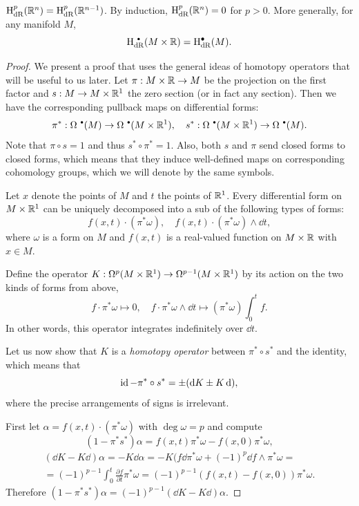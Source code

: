 \begin{thm}\label{Poincare lem}
    $\mathrm{H}^p_{\rm dR}(\mathbb{R}^{n})=\mathrm{H}^{p}_{\rm dR}(\mathbb{R}^{n-1})$. By induction, $\mathrm{H}^p_{\rm dR}(\mathbb{R}^{n})=0$ for $p>0$. More generally, for any manifold $M$,
    \[\rmH^{\smbullet }_{\rm dR}(M\times\bbR)=\rmH^{\bullet}_{\rm dR}(M).\]
\end{thm}
\begin{proof}
    We present a proof that uses the general ideas of homotopy operators that will be useful to us later. Let $\pi:M\times\mathbb{R} \to M$ be the projection on the first factor and $s:M\to M\times\mathbb{R}^1$ the zero section (or in fact any section). Then we have the corresponding pullback maps on differential forms:
    \[\pi^\ast:\Omega^{\smbullet }(M)\to \Omega^{\smbullet }(M\times\bbR^1),\quad s^\ast: \Omega^{\smbullet }(M\times\bbR^1)\to \Omega^{\smbullet }(M).\]
    Note that $\pi\circ s=1$ and thus $s^\ast\circ\pi^\ast=1$. Also, both $s$ and $\pi$ send closed forms to closed forms, which means that they induce well-defined maps on corresponding cohomology groups, which we will denote by the same symbols.
    
    Let $x$ denote the points of $M$ and $t$ the points of $\mathbb{R}^1$. Every differential form on $M\times\mathbb{R}^1$ can be uniquely decomposed into a sub of the following types of forms:
    \[f(x,t)\cdot (\pi^\ast\omega),\quad f(x,t)\cdot(\pi^\ast\omega)\wedge\dd t,\]
    where $\omega$ is a form on $M$ and $f(x,t)$ is a real-valued function on $M\times\mathbb{R}$ with $x\in M$.
    
    Define the operator $K:\Omega^p(M\times\mathbb{R}^1)\to \Omega^{p-1}(M\times\mathbb{R}^1)$ by its action on the two kinds of forms from above,
    \[f\cdot \pi^\ast \omega\mapsto 0,\quad f\cdot\pi^\ast \omega \wedge\dd t\mapsto (\pi^\ast\omega)\int_0^t f.\]
    In other words, this operator integrates indefinitely over $\dd t$.
    
    Let us now show that $K$ is a \emph{homotopy operator} between $\pi^\ast\circ s^\ast$ and the identity, which means that
    \[\operatorname{id}-\pi^\ast\circ s^\ast=\pm (\mathop{}\!\mathrm{d} K\pm K \mathop{}\!\mathrm{d}),\]
    where the precise arrangements of signs is irrelevant.
    
    First let $\alpha=f(x,t)\cdot (\pi^\ast\omega)$ with $\deg \omega=p$ and compute
    \[(1-\pi^\ast s^\ast)\alpha=f(x,t)\pi^\ast\omega-f(x,0)\pi^\ast\omega,\]
    \begin{multline}
        (\dd K-K \dd)\alpha=-K\dd\alpha=-K(f\dd\pi^\ast\omega+(-1)^p\dd f\wedge\pi^\ast\omega=\\=(-1)^{p-1}\int_0^t\frac{\partial f}{\partial t}\pi^\ast\omega=(-1)^{p-1}(f(x,t)-f(x,0))\pi^\ast\omega.
    \end{multline}
    Therefore $(1-\pi^\ast s^\ast)\alpha=(-1)^{p-1}(\dd K-K \dd)\alpha$.
    

\end{proof}
